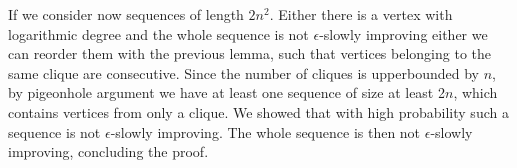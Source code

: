 If we consider now sequences of length $2n^2$. Either there is a vertex with logarithmic degree and the whole sequence is not $\epsilon$-slowly improving either we can reorder them with the previous lemma, such that vertices belonging to the same clique are consecutive. Since the number of cliques is upperbounded by $n$, by pigeonhole argument we have at least one sequence of size at least 2$n$, which contains vertices from only a clique. We showed that with high probability such a sequence is not $\epsilon$-slowly improving. The whole sequence is then not $\epsilon$-slowly improving, concluding the proof.